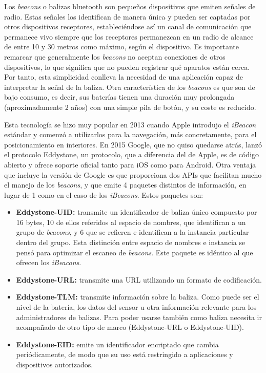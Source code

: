 Los \textit{beacons} o balizas bluetooth son pequeños dispositivos que emiten señales de radio. Estas señales los identifican de manera única y pueden ser captadas por otros dispositivos receptores, estableciéndose así un canal de comunicación que permanece vivo siempre que los receptores permanezcan en un radio de alcance de entre 10 y 30 metros como máximo, según el dispositivo. Es importante remarcar que generalmente los \textit{beacons} no aceptan conexiones de otros dispositivos, lo que significa que no pueden registrar qué aparatos están cerca. Por tanto, esta simplicidad conlleva la necesidad de una aplicación capaz de interpretar la señal de la baliza. Otra característica de los \textit{beacons} es que son de bajo consumo, es decir, sus baterías tienen una duración muy prolongada (aproximadamente 2 años) con una simple pila de botón, y su coste es reducido.

Esta tecnología se hizo muy popular en 2013 cuando Apple introdujo el \textit{iBeacon} estándar y comenzó a utilizarlos para la navegación, más concretamente, para el posicionamiento en interiores. En 2015 Google, que no quiso quedarse atrás, lanzó el protocolo Eddystone, un protocolo, que a diferencia del de Apple, es de código abierto y ofrece soporte oficial tanto para iOS como para Android. Otra ventaja que incluye la versión de Google es que proporciona dos APIs que facilitan mucho el manejo de los \textit{beacons}, y que emite 4 paquetes distintos de información, en lugar de 1 como en el caso de los \textit{iBeacons}. Estos paquetes son:

\begin{itemize}
	\item \textbf{Eddystone-UID:} transmite un identificador de baliza único compuesto por 16 bytes, 10 de ellos referidos al espacio de nombres, que identifican a un grupo de \textit{beacons}, y 6 que se refieren e identifican a la instancia particular dentro del grupo. Esta distinción entre espacio de nombres e instancia se pensó para optimizar el escaneo de \textit{beacons}. Este paquete es idéntico al que ofrecen los \textit{iBeacons}.
	\item \textbf{Eddystone-URL:} transmite una URL utilizando un formato de codificación.
	\item \textbf{Eddystone-TLM:} transmite información sobre la baliza. Como puede ser el nivel de la batería, los datos del sensor u otra información relevante para los administradores de balizas. Para poder usarse también como baliza necesita ir acompañado de otro tipo de marco (Eddystone-URL o Eddystone-UID).
	\item \textbf{Eddystone-EID:} emite un identificador encriptado que cambia periódicamente, de modo que su uso está restringido a aplicaciones y dispositivos autorizados.
\end{itemize}

